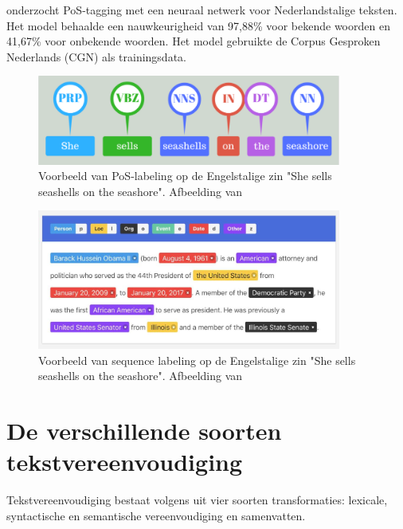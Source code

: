 
\textcite{Poel2008} onderzocht PoS-tagging met een neuraal netwerk voor Nederlandstalige teksten. Het model behaalde een nauwkeurigheid van 97,88\% voor bekende woorden en 41,67\% voor onbekende woorden. Het model gebruikte de Corpus Gesproken Nederlands (CGN) als trainingsdata.

\begin{figure}[H]
	\begin{center}
		\includegraphics[width=10cm]{img/poslabeling.png}
	\end{center}
	\caption{Voorbeeld van PoS-labeling op de Engelstalige zin "She sells seashells on the seashore". Afbeelding van \textcite{Bilisci2021} }
	\label{fig:pos}
\end{figure}

\begin{figure}[H]
	\begin{center}
		\includegraphics[width=10cm]{img/nerlabeling.jpg}
	\end{center}
	\caption{Voorbeeld van sequence labeling op de Engelstalige zin "She sells seashells on the seashore". Afbeelding van \textcite{Bilisci2021} }
	\label{fig:ner}
\end{figure}

\section{De verschillende soorten tekstvereenvoudiging}

Tekstvereenvoudiging bestaat volgens \textcite{Siddharthan2014} uit vier soorten transformaties: lexicale, syntactische en semantische vereenvoudiging en samenvatten.

